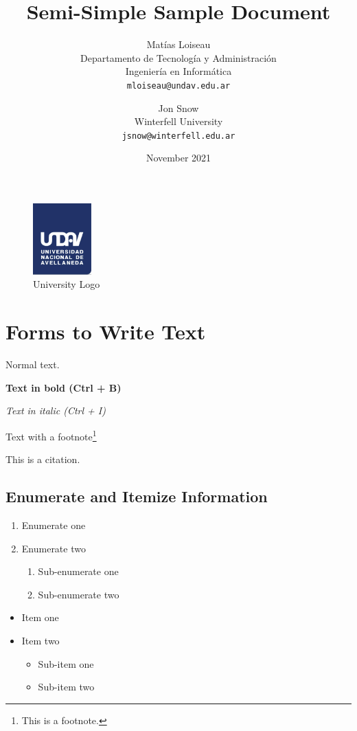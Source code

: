 \documentclass{article} %
\title{Semi-Simple Sample Document}
\date{November 2021}
\author{
    Matías Loiseau\\
    Departamento de Tecnología y Administración\\
    Ingeniería en Informática\\
    \texttt{mloiseau@undav.edu.ar}
    \and
    Jon Snow\\
    Winterfell University\\
    \texttt{jsnow@winterfell.edu.ar}
}
\begin{document}
\begin{figure}
    \centering
    \includegraphics[width=0.2\textwidth]{images/undav-logo}
    \caption{University Logo}
    \label{fig:undav-logo}
\end{figure}

\maketitle %
\thispagestyle{empty} %
\clearpage

\tableofcontents %
\clearpage

\section{Forms to Write Text} %
Normal text.

\textbf{Text in bold (Ctrl + B)}

\textit{Text in italic (Ctrl + I)}

Text with a footnote\footnote{This is a footnote.}

This is a citation\cite{knn}.

\subsection{Enumerate and Itemize Information}

\begin{enumerate}
    \item Enumerate one
    \item Enumerate two
    \begin{enumerate}
        \item Sub-enumerate one
        \item Sub-enumerate two
    \end{enumerate}
\end{enumerate}

\begin{itemize}
    \item Item one
    \item Item two
    \begin{itemize}
        \item Sub-item one
        \item Sub-item two
    \end{itemize}
\end{itemize}
\end{document}
